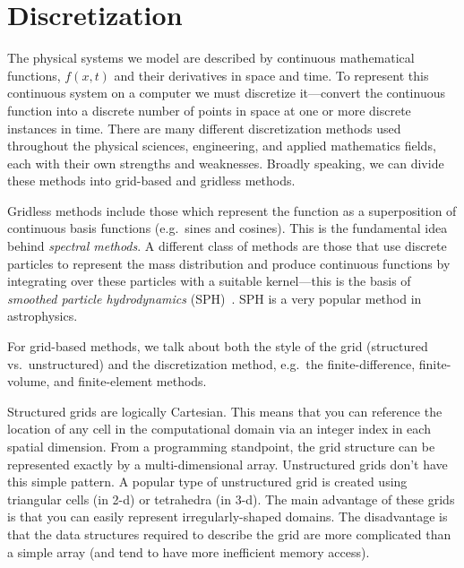 \label{ch:fv}

\section{Discretization}

The physical systems we model are described by continuous mathematical
functions, $f(x,t)$ and their derivatives in space and time.  To
represent this continuous system on a computer we must discretize
it---convert the continuous function into a discrete number of points
in space at one or more discrete instances in time.
There are many different discretization methods used throughout the
physical sciences, engineering, and applied mathematics fields, each
with their own strengths and weaknesses.  Broadly speaking, we can
divide these methods into grid-based and gridless methods.


Gridless methods include those which represent the function as a
superposition of continuous basis functions (e.g.\ sines and cosines).
This is the fundamental idea behind {\em spectral methods}.  A different
class of methods are those that use discrete particles to represent the
mass distribution and produce continuous functions by integrating
over these particles with a suitable kernel---this is the basis of
{\em smoothed particle hydrodynamics} (SPH)~\cite{SPH}.  SPH is a very popular
method in astrophysics.

For grid-based methods, we talk about both the style of the grid
(structured vs.\ unstructured) and the discretization method, e.g.\ the
finite-difference, finite-volume, and finite-element methods.

Structured grids are logically Cartesian.  This means that you can
reference the location of any cell in the computational domain via an
integer index in each spatial dimension.  From a programming
standpoint, the grid structure can be represented exactly by a
multi-dimensional array.  Unstructured grids don't have this simple
pattern.  A popular type of unstructured grid is created using
triangular cells (in 2-d) or tetrahedra (in 3-d).   The main advantage of these grids is that you can easily
represent irregularly-shaped domains.  The disadvantage is that the
data structures required to describe the grid are more complicated
than a simple array (and tend to have more inefficient memory access).

